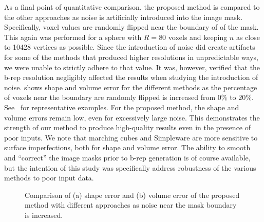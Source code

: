 {As a final point of quantitative comparison, the proposed method is compared to the other approaches as noise is artificially introduced into the image mask. Specifically, voxel values are randomly flipped near the boundary of of the mask. This again was performed for a sphere with $R = 80$ voxels and keeping $n$ as close to 10428 vertices as possible. Since the introduction of noise did create artifacts for some of the methods that produced higher resolutions in unpredictable ways, we were unable to strictly adhere to that value. It was, however, verified that the b-rep resolution negligibly affected the results when studying the introduction of noise.  shows shape and volume error for the different methods as the percentage of voxels near the boundary are randomly flipped is increased from $0\%$ to $20\%$. See~ for representative examples. For the proposed method, the shape and volume errors remain low, even for excessively large noise. This demonstrates the strength of our method to produce high-quality results even in the presence of poor inputs. We note that marching cubes and Simpleware are more sensitive to surface imperfections, both for shape and volume error. The ability to smooth and ``correct'' the image masks prior to b-rep generation is of course available, but the intention of this study was specifically address robustness of the various methods to poor input data.}
\begin{figure}[b!]
	\centering
	\caption{{Comparison of (a) shape error and (b) volume error of the proposed method with different approaches as noise near the mask boundary is increased.}}
	\label{fig:graph4}
\end{figure}
